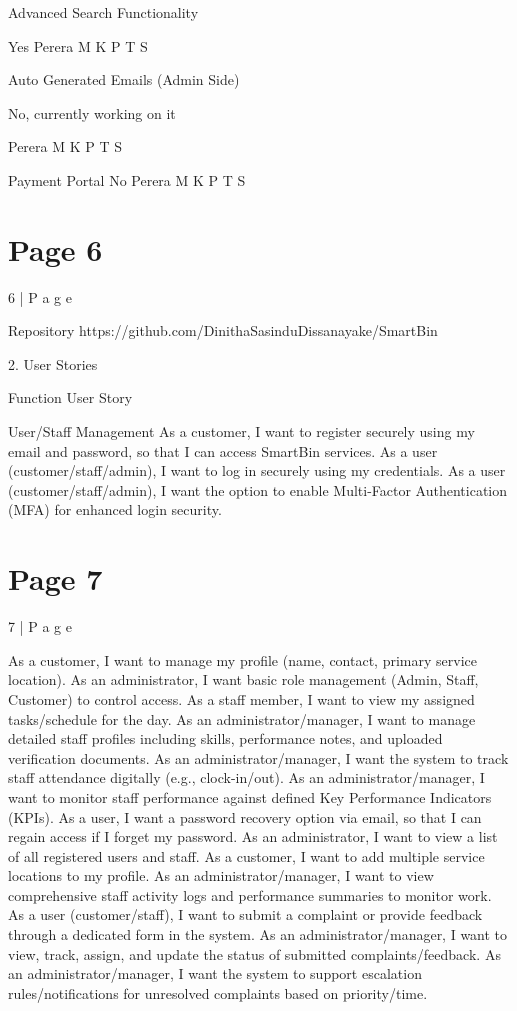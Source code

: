 \documentclass{article}
\begin{document}
Advanced Search Functionality 
 
Yes Perera M K P T S 
 
Auto Generated Emails (Admin Side) 
 
No, currently 
working on it 
 
Perera M K P T S 
 
Payment Portal No Perera M K P T S 

\section*{Page 6}
6 | P a g e 
 
  
 
 
 
 
 
 
 
 
 
Repository 
https://github.com/DinithaSasinduDissanayake/SmartBin 
 
 
 
 
 
 
 
2. User Stories 
 
  Function  User Story  
 
User/Staff 
Management 
As a customer, I want to register securely using my email and 
password, so that I can access SmartBin services.  
As a user (customer/staff/admin), I want to log in securely using 
my credentials.  
As a user (customer/staff/admin), I want the option to enable 
Multi-Factor Authentication (MFA) for enhanced login security.  

\section*{Page 7}
7 | P a g e 
 
As a customer, I want to manage my profile (name, contact, 
primary service location).  
As an administrator, I want basic role management (Admin, Staff, 
Customer) to control access.  
As a staff member, I want to view my assigned tasks/schedule for 
the day.  
As an administrator/manager, I want to manage detailed staff 
profiles including skills, performance notes, and uploaded 
verification documents.  
As an administrator/manager, I want the system to track staff 
attendance digitally (e.g., clock-in/out).  
As an administrator/manager, I want to monitor staff performance 
against defined Key Performance Indicators (KPIs).  
As a user, I want a password recovery option via email, so that I can 
regain access if I forget my password.  
As an administrator, I want to view a list of all registered users and 
staff.  
As a customer, I want to add multiple service locations to my 
profile.  
As an administrator/manager, I want to view comprehensive staff 
activity logs and performance summaries to monitor work.  
As a user (customer/staff), I want to submit a complaint or provide 
feedback through a dedicated form in the system.  
As an administrator/manager, I want to view, track, assign, and 
update the status of submitted complaints/feedback.  
As an administrator/manager, I want the system to support 
escalation rules/notifications for unresolved complaints based on 
priority/time.  
 
\end{document}
